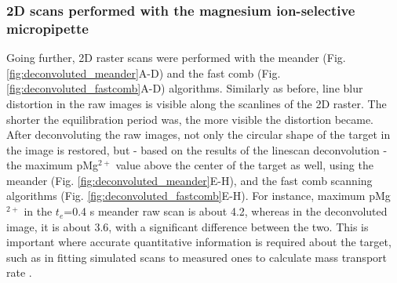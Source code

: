 			\subsubsection{2D scans performed with the magnesium ion-selective micropipette}

Going further, 2D raster scans were performed with the meander (Fig. \ref{fig:deconvoluted_meander}A-D) and the fast comb (Fig. \ref{fig:deconvoluted_fastcomb}A-D) algorithms.
Similarly as before, line blur distortion in the raw images is visible along the scanlines of the 2D raster.
The shorter the equilibration period was, the more visible the distortion became.
After deconvoluting the raw images, not only the circular shape of the target in the image is restored, but - based on the results of the linescan deconvolution - the maximum pMg$^{2+}$ value above the center of the target as well, using the meander (Fig. \ref{fig:deconvoluted_meander}E-H), and the fast comb scanning algorithms (Fig. \ref{fig:deconvoluted_fastcomb}E-H).
For instance, maximum pMg$^{2+}$ in the $t_e$=0.4 s meander raw scan is about 4.2, whereas in the deconvoluted image, it is about 3.6, with a significant difference between the two.
This is important where accurate quantitative information is required about the target, such as in fitting simulated scans to measured ones to calculate mass transport rate \cite{gyurcsanyi2004chemical}.\def\s{0.25}


